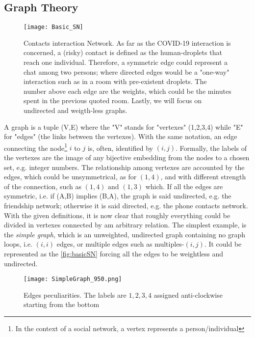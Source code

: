\documentclass[a4paper,10pt,twoside]{book} %
\theoremstyle{definition}
\begin{document}
\subsection{Graph Theory}
\label{sec:GraphTheory}
\begin{figure}[htbp]
	\centering
	\texttt{[image: Basic\_SN]}
	\caption{Contacts interaction Network. As far as the COVID-19 interaction is concerned, a (risky) contact is defined as the human-droplets that reach one individual. Therefore, a symmetric edge could represent a chat among two persons; where directed edges would be a "one-way" interaction such as in a room with pre-existent droplets. The number above each edge are the weights, which could be the minutes spent in the previous quoted room. Lastly, we will focus on undirected and weigth-less graphs.}
	\label{fig:basicSN}
\end{figure}

A graph is a tuple (V,E) where the "V" stands for "vertexes" (1,2,3,4) while "E" for "edges" (the links between the vertexes).
With the same notation, an edge connecting the node\footnote{In the context of a social network, a vertex represents a person/individual} $i$ to $j$ is, often, identified by $(i,j)$.
Formally, the labels of the vertexes are the image of any bijective embedding from the nodes to a chosen set, e.g. integer numbers. The relationship among vertexes are accounted by the edges, which could be unsymmetrical, as for $(1,4)$, and with different strength of the connection, such as $(1,4) \text{ and } (1,3)$ which. If all the edges are symmetric, i.e. if (A,B) implies (B,A), the graph is said undirected, e.g. the friendship network; otherwise it is said directed, e.g. the phone contacts network. 
With the given definitions, it is now clear that roughly everything could be divided in vertexes connected by am arbitrary relation.
The simplest example, is the \textit{simple graph}, which is an unweighted, undirected graph containing no graph loops, i.e. $(i,i)$ edges, or multiple edges such as multiples-$(i,j)$. It could be represented as the \autoref{fig:basicSN} forcing all the edges to be weightless and undirected.
\begin{figure}[ht]
	\texttt{[image: SimpleGraph\_950.png]}
	\caption{Edges peculiarities. The labels are $1,2,3,4$ assigned anti-clockwise starting from the bottom}
	\label{fig:simple}
\end{figure}
\newpage
\end{document}
